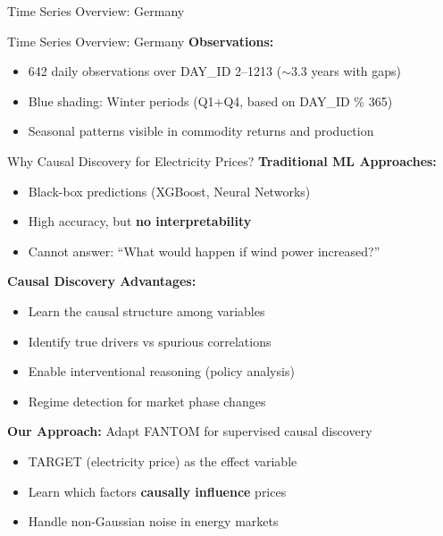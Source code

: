 \documentclass[aspectratio=169]{beamer}
\begin{document}
\begin{frame}{Time Series Overview: Germany}
\begin{center}

\end{center}
\end{frame}

\begin{frame}{Time Series Overview: Germany}
\textbf{Observations:}
\begin{itemize}
    \item 642 daily observations over DAY\_ID 2--1213 ($\sim$3.3 years with gaps)
    \item \textcolor{paperblue}{Blue shading}: Winter periods (Q1+Q4, based on DAY\_ID \% 365)
    \item Seasonal patterns visible in commodity returns and production
\end{itemize}
\end{frame}

\begin{frame}{Why Causal Discovery for Electricity Prices?}
\textbf{Traditional ML Approaches:}
\begin{itemize}
    \item Black-box predictions (XGBoost, Neural Networks)
    \item High accuracy, but \textbf{no interpretability}
    \item Cannot answer: ``What would happen if wind power increased?''
\end{itemize}

\vspace{0.3cm}
\textbf{Causal Discovery Advantages:}
\begin{itemize}
    \item \textcolor{reprogreen}{Learn the causal structure} among variables
    \item \textcolor{reprogreen}{Identify true drivers} vs spurious correlations
    \item \textcolor{reprogreen}{Enable interventional reasoning} (policy analysis)
    \item \textcolor{reprogreen}{Regime detection} for market phase changes
\end{itemize}

\vspace{0.3cm}
\textbf{Our Approach:} Adapt FANTOM for supervised causal discovery
\begin{itemize}
    \item TARGET (electricity price) as the effect variable
    \item Learn which factors \textbf{causally influence} prices
    \item Handle non-Gaussian noise in energy markets
\end{itemize}
\end{frame}
\end{document}
